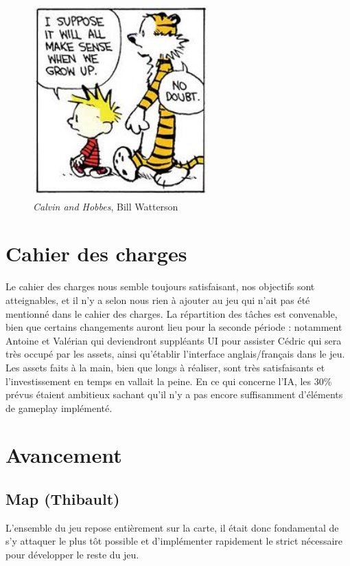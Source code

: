 \documentclass[12pt]{report}
\begin{document}
\begin{figure}
    \centering
    \includegraphics[width=0.6\textwidth]{project_mood_S1}
    \caption*{\textit{Calvin and Hobbes}, Bill Watterson}
\end{figure}

\chapter{Cahier des charges}

Le cahier des charges nous semble toujours satisfaisant, nos objectifs sont atteignables, et il n'y a selon nous rien à ajouter au jeu qui n'ait pas été mentionné dans le cahier des charges. La répartition des tâches est convenable, bien que certains changements auront lieu pour la seconde période : notamment Antoine et Valérian qui deviendront suppléants UI pour assister Cédric qui sera très occupé par les assets, ainsi qu'établir l'interface anglais/français dans le jeu. Les assets faits à la main, bien que longs à réaliser, sont très satisfaisants et l'investissement en temps en vallait la peine. En ce qui concerne l'IA, les 30\% prévus étaient ambitieux sachant qu'il n'y a pas encore suffisamment d'éléments de gameplay implémenté.

\chapter{Avancement}

\section{Map (Thibault)}

L’ensemble du jeu repose entièrement sur la carte, il était donc fondamental de s’y attaquer le plus tôt possible et d’implémenter rapidement le strict nécessaire pour développer le reste du jeu.
\end{document}
